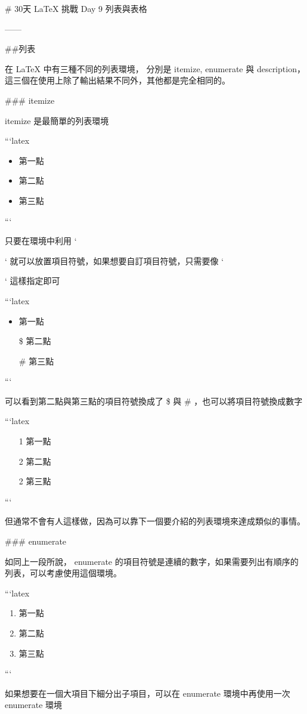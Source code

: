\begin{markdown}
# 30天 LaTeX 挑戰 Day 9 列表與表格

------

##列表

在 LaTeX 中有三種不同的列表環境， 分別是 itemize, enumerate 與 description，這三個在使用上除了輸出結果不同外，其他都是完全相同的。

### itemize

itemize 是最簡單的列表環境

```latex
\begin{itemize}
\item 第一點
\item 第二點
\item 第三點
\end{itemize}
```

只要在環境中利用 `\item` 就可以放置項目符號，如果想要自訂項目符號，只需要像 `\item[]` 這樣指定即可

```latex
\begin{itemize}
\item 第一點
\item[\$]第二點
\item[\#]第三點
\end{itemize}
```

可以看到第二點與第三點的項目符號換成了 \$ 與 \# ，也可以將項目符號換成數字

```latex
\begin{itemize}
\item[1]第一點
\item[2]第二點
\item[2]第三點
\end{itemize}
```

但通常不會有人這樣做，因為可以靠下一個要介紹的列表環境來達成類似的事情。

### enumerate

如同上一段所說， enumerate 的項目符號是連續的數字，如果需要列出有順序的列表，可以考慮使用這個環境。

```latex
\begin{enumerate}
\item 第一點
\item 第二點
\item 第三點
\end{enumerate}
```

如果想要在一個大項目下細分出子項目，可以在 enumerate 環境中再使用一次 enumerate 環境


\end{markdown}
